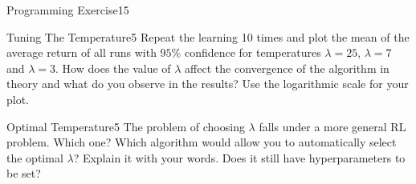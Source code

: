 \begin{questions}
\begin{question}{Programming Exercise}{15}
\begin{answer}
\end{answer}

\end{question}



\begin{question}{Tuning The Temperature}{5}
Repeat the learning 10 times and plot the mean of the average return of all runs with $95\%$ confidence for temperatures $\lambda = 25$, $\lambda = 7$ and $\lambda = 3$. How does the value of $\lambda$ affect the convergence of the algorithm in theory and what do you observe in the results? 
Use the logarithmic scale for your plot.

\begin{answer}

\end{answer}


\end{question}


\begin{question}[bonus]{Optimal Temperature}{5}
The problem of choosing $\lambda$ falls under a more general RL problem. Which one?
Which algorithm would allow you to automatically select the optimal $\lambda$? Explain it with your words.
Does it still have hyperparameters to be set?

\begin{answer}

\end{answer}


\end{question}


\end{questions}

